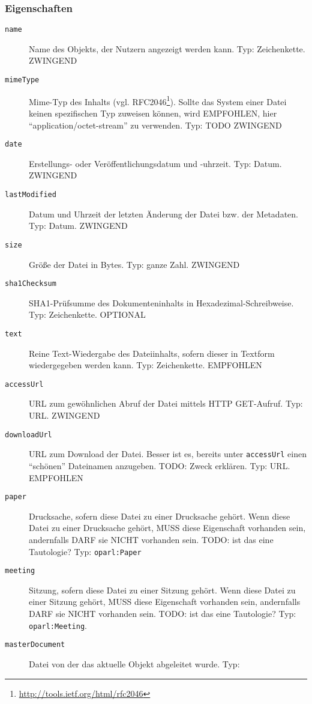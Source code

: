 \documentclass[,a4paper]{article}
\begin{document}
\subsubsection{Eigenschaften}\label{eigenschaften-7}

\begin{description}
\item[\texttt{name}]
Name des Objekts, der Nutzern angezeigt werden kann. Typ: Zeichenkette.
ZWINGEND
\item[\texttt{mimeType}]
Mime-Typ des Inhalts (vgl. RFC2046\footnote{\url{http://tools.ietf.org/html/rfc2046}}).
Sollte das System einer Datei keinen spezifischen Typ zuweisen können,
wird EMPFOHLEN, hier ``application/octet-stream'' zu verwenden. Typ:
TODO ZWINGEND
\item[\texttt{date}]
Erstellungs- oder Veröffentlichungsdatum und -uhrzeit. Typ: Datum.
ZWINGEND
\item[\texttt{lastModified}]
Datum und Uhrzeit der letzten Änderung der Datei bzw. der Metadaten.
Typ: Datum. ZWINGEND
\item[\texttt{size}]
Größe der Datei in Bytes. Typ: ganze Zahl. ZWINGEND
\item[\texttt{sha1Checksum}]
SHA1-Prüfsumme des Dokumenteninhalts in Hexadezimal-Schreibweise. Typ:
Zeichenkette. OPTIONAL
\item[\texttt{text}]
Reine Text-Wiedergabe des Dateiinhalts, sofern dieser in Textform
wiedergegeben werden kann. Typ: Zeichenkette. EMPFOHLEN
\item[\texttt{accessUrl}]
URL zum gewöhnlichen Abruf der Datei mittels HTTP GET-Aufruf. Typ: URL.
ZWINGEND
\item[\texttt{downloadUrl}]
URL zum Download der Datei. Besser ist es, bereits unter
\texttt{accessUrl} einen ``schönen'' Dateinamen anzugeben. TODO: Zweck
erklären. Typ: URL. EMPFOHLEN
\item[\texttt{paper}]
Drucksache, sofern diese Datei zu einer Drucksache gehört. Wenn diese
Datei zu einer Drucksache gehört, MUSS diese Eigenschaft vorhanden sein,
andernfalls DARF sie NICHT vorhanden sein. TODO: ist das eine
Tautologie? Typ: \texttt{oparl:Paper}
\item[\texttt{meeting}]
Sitzung, sofern diese Datei zu einer Sitzung gehört. Wenn diese Datei zu
einer Sitzung gehört, MUSS diese Eigenschaft vorhanden sein, andernfalls
DARF sie NICHT vorhanden sein. TODO: ist das eine Tautologie? Typ:
\texttt{oparl:Meeting}.
\item[\texttt{masterDocument}]
Datei von der das aktuelle Objekt abgeleitet wurde. Typ:

\end{description}
\end{document}
